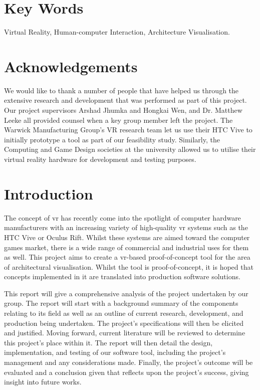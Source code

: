 \section{Key Words}
    Virtual Reality, Human-computer Interaction, Architecture Visualisation.

\section{Acknowledgements}

    We would like to thank a number of people that have helped us through the extensive research and development that was performed as part of this project. Our project supervisors Arshad Jhumka and Hongkai Wen, and Dr. Matthew Leeke all provided counsel when a key group member left the project. The Warwick Manufacturing Group's VR research team let us use their HTC Vive to initially prototype a tool as part of our feasibility study. Similarly, the Computing and Game Design societies at the university allowed us to utilise their virtual reality hardware for development and testing purposes.
    
\section{Introduction}

    The concept of \acrfull{vr} has recently come into the spotlight of computer hardware manufacturers with an increasing variety of high-quality \acrshort{vr} systems such as the HTC Vive or Oculus Rift. Whilst these systems are aimed toward the computer games market, there is a wide range of commercial and industrial uses for them as well. This project aims to create a \acrshort{vr}-based proof-of-concept tool for the area of architectural visualisation. Whilst the tool is proof-of-concept, it is hoped that concepts implemented in it are translated into production software solutions.
    
    This report will give a comprehensive analysis of the project undertaken by our group. The report will start with a background summary of the components relating to its field as well as an outline of current research, development, and production being undertaken. The project's specifications will then be elicited and justified. Moving forward, current literature will be reviewed to determine this project's place within it. The report will then detail the design, implementation, and testing of our software tool, including the project's management and any considerations made. Finally, the project's outcome will be evaluated and a conclusion given that reflects upon the project's success, giving insight into future works.